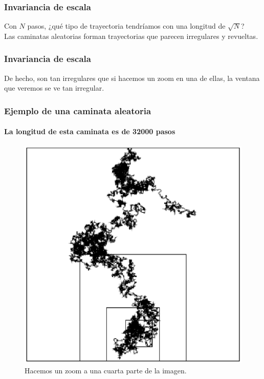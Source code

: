 \documentclass[12pt]{beamer}
\begin{document}
\begin{frame}
\frametitle{Invariancia de escala}
Con $N$ pasos, ¿qué tipo de trayectoria tendríamos con una longitud de $\sqrt{N}$?
\\
\bigskip
\pause
Las caminatas aleatorias forman trayectorias que parecen irregulares y revueltas. 
\end{frame}
\begin{frame}
\frametitle{Invariancia de escala}
De hecho, son tan irregulares que si hacemos un zoom en una de ellas, la ventana que veremos se ve tan irregular.
\end{frame}
\begin{frame}[plain]
\frametitle{Ejemplo de una caminata aleatoria}
\framesubtitle{La longitud de esta caminata es de 32000 pasos}
\begin{figure}
	\centering
	\includegraphics[scale=0.5]{Imagenes/caminataAleatoria_01.eps}
	\caption{Hacemos un zoom a una cuarta parte de la imagen.}
\end{figure}
\end{frame}
\end{document}
